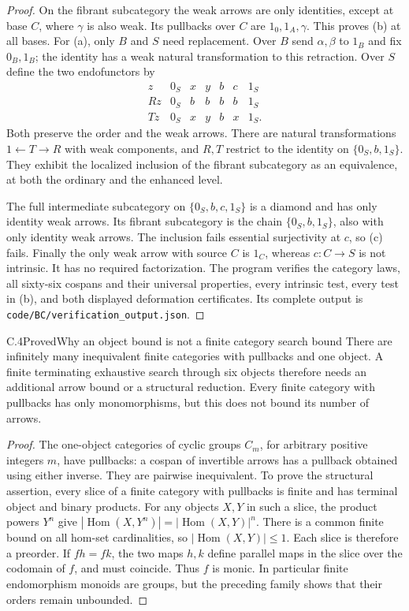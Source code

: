 \begin{proof}
On the fibrant subcategory the weak arrows are only identities,
except at base $C$, where $\gamma$ is also weak. Its pullbacks
over $C$ are $1_0,1_A,\gamma$. This proves (b) at all bases.
For (a), only $B$ and $S$ need replacement. Over $B$ send
$\alpha,\beta$ to $1_B$ and fix $0_B,1_B$; the identity has a
weak natural transformation to this retraction. Over $S$ define
the two endofunctors by
\[
\begin{array}{c|rrrrrr}
z&0_S&x&y&b&c&1_S\\\hline
Rz&0_S&b&b&b&b&1_S\\
Tz&0_S&x&y&b&x&1_S .
\end{array}
\]
Both preserve the order and the weak arrows. There are natural
transformations $1\leftarrow T\to R$ with weak components, and
$R,T$ restrict to the identity on $\{0_S,b,1_S\}$. They exhibit
the localized inclusion of the fibrant subcategory as an
equivalence, at both the ordinary and the enhanced level.

The full intermediate subcategory on $\{0_S,b,c,1_S\}$ is a
diamond and has only identity weak arrows. Its fibrant subcategory
is the chain $\{0_S,b,1_S\}$, also with only identity weak arrows.
The inclusion fails essential surjectivity at $c$, so (c) fails.
Finally the only weak arrow with source $C$ is $1_C$, whereas
$c:C\to S$ is not intrinsic. It has no required factorization.
The program verifies the category laws, all sixty-six cospans and
their universal properties, every intrinsic test, every test in
(b), and both displayed deformation certificates. Its complete
output is \texttt{code/BC/verification\_output.json}.
\end{proof}

\begin{claim}{C.4}{Proved}{Why an object bound is not a finite category search bound}
There are infinitely many inequivalent finite categories with
pullbacks and one object. A finite terminating exhaustive search
through six objects therefore needs an additional arrow bound or
a structural reduction. Every finite category with pullbacks has
only monomorphisms, but this does not bound its number of arrows.
\end{claim}
\begin{proof}
The one-object categories of cyclic groups $C_m$, for arbitrary
positive integers $m$, have pullbacks: a cospan of invertible
arrows has a pullback obtained using either inverse. They are
pairwise inequivalent. To prove the structural assertion, every
slice of a finite category with pullbacks is finite and has
terminal object and binary products. For any objects $X,Y$ in
such a slice, the product powers $Y^n$ give
$|\operatorname{Hom}(X,Y^n)|=|\operatorname{Hom}(X,Y)|^n$.
There is a common finite bound on all hom-set cardinalities,
so $|\operatorname{Hom}(X,Y)|\le1$. Each slice is therefore a
preorder. If $fh=fk$, the two maps $h,k$ define parallel maps
in the slice over the codomain of $f$, and must coincide.
Thus $f$ is monic. In particular finite endomorphism monoids
are groups, but the preceding family shows that their orders
remain unbounded.
\end{proof}

